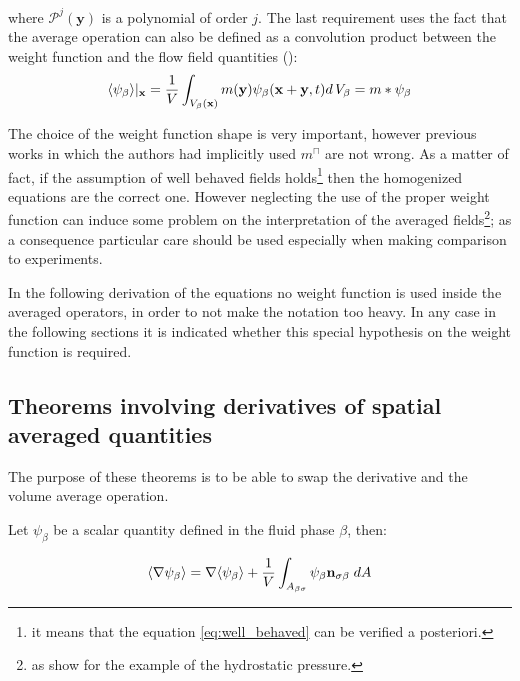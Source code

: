 \noindent where $\mathcal{P}^j(\mathbf{y})$ is a polynomial of order $j$.
The last requirement uses the fact that the average operation can also be defined as a convolution product between the weight function and the flow field quantities (\citet{marle1982macroscopic}):
\begin{equation}
{\left< \psi_{\beta} \right>}|_{\mathbf{x}} = \dfrac{1}{V} \int_{V_\beta(\mathbf{x})} m(\mathbf{y}) \psi_{\beta}(\mathbf{x}+\mathbf{y}, t) d \, V_\beta = m*\psi_{\beta}
\label{eq:marle}
\end{equation}

The choice of the weight function shape is very important, however previous works in which the authors had implicitly used $m^{\sqcap}$ are not wrong.
As a matter of fact, if the assumption of well behaved fields holds\footnote{it means that the equation \eqref{eq:well_behaved} can be verified a posteriori.} then the homogenized equations are the correct one.
However neglecting the use of the proper weight function can induce some problem on the interpretation of the averaged fields\footnote{as \citet{quintard1994transport1} show for the example of the hydrostatic pressure.}; as a consequence particular care should be used especially when making comparison to experiments.

In the following derivation of the equations no weight function is used inside the averaged operators, in order to not make the notation too heavy.
In any case in the following sections it is indicated whether this special hypothesis on the weight function is required.

\subsection{Theorems involving derivatives of spatial averaged quantities}

The purpose of these theorems is to be able to swap the derivative and the volume average operation.

\begin{theorem}
Let $\psi_{\beta}$ be a scalar quantity defined in the fluid phase $\beta$, then:

	\begin{equation}
		{\left< \nabla \psi_{\beta} \right>} = \nabla {\left< \psi_{\beta} \right>} + \dfrac{1}{V} \int_{A_{\beta \sigma}} \psi_{\beta} \mathbf{n}_{\sigma \beta}   \;dA
			\label{th:spat_avg}
	\end{equation}
\end{theorem}

